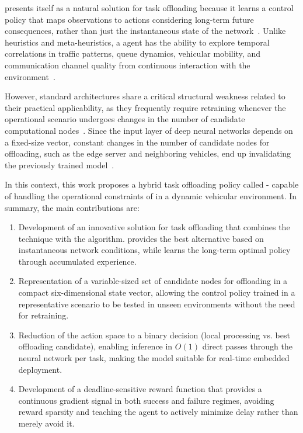  presents itself as a natural solution for task offloading because it learns a control policy that maps observations to actions considering long-term future consequences, rather than just the instantaneous state of the network~\cite{liu2019,shi2023}. Unlike heuristics and meta-heuristics, a  agent has the ability to explore temporal correlations in traffic patterns, queue dynamics, vehicular mobility, and communication channel quality from continuous interaction with the environment~\cite{li2025drl_survey,uddin2025}.

However, standard  architectures share a critical structural weakness related to their practical applicability, as they frequently require retraining whenever the operational scenario undergoes changes in the number of candidate computational nodes~\cite{miriyala2026dl_offload_review}. Since the input layer of deep neural networks depends on a fixed-size vector, constant changes in the number of candidate nodes for offloading, such as the edge server and neighboring vehicles, end up invalidating the previously trained model~\cite{uddin2025}.

In this context, this work proposes a hybrid task offloading policy called - capable of handling the operational constraints of  in a dynamic vehicular environment. In summary, the main contributions are:

\begin{enumerate}[leftmargin=*,nosep]
  \item Development of an innovative solution for task offloading that combines the  technique with the  algorithm.  provides the best alternative based on instantaneous network conditions, while  learns the long-term optimal policy through accumulated experience.
  \item Representation of a variable-sized set of candidate nodes for offloading in a compact six-dimensional state vector, allowing the control policy trained in a representative scenario to be tested in unseen environments without the need for retraining.
  \item Reduction of the action space to a binary decision (local processing vs. best offloading candidate), enabling inference in $O(1)$ direct passes through the neural network per task, making the model suitable for real-time embedded deployment.
  \item Development of a deadline-sensitive reward function that provides a continuous gradient signal in both success and failure regimes, avoiding reward sparsity and teaching the agent to actively minimize delay rather than merely avoid it.
\end{enumerate}

